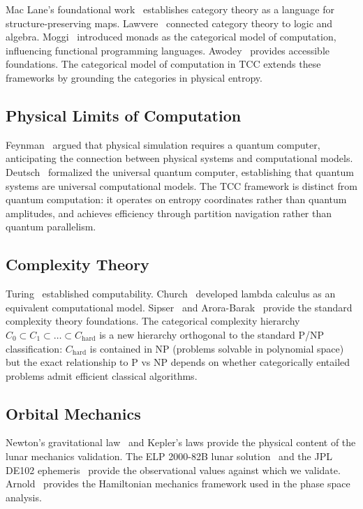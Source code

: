 \documentclass[12pt,twocolumn]{article}
\begin{document}
Mac Lane's foundational work~\cite{maclane1998categories} establishes category theory as a language for structure-preserving maps. Lawvere~\cite{lawvere1963functorial} connected category theory to logic and algebra. Moggi~\cite{moggi1991notions} introduced monads as the categorical model of computation, influencing functional programming languages. Awodey~\cite{awodey2010category} provides accessible foundations. The categorical model of computation in TCC extends these frameworks by grounding the categories in physical entropy.

\subsection{Physical Limits of Computation}

Feynman~\cite{feynman1982simulating} argued that physical simulation requires a quantum computer, anticipating the connection between physical systems and computational models. Deutsch~\cite{deutsch1985quantum} formalized the universal quantum computer, establishing that quantum systems are universal computational models. The TCC framework is distinct from quantum computation: it operates on entropy coordinates rather than quantum amplitudes, and achieves efficiency through partition navigation rather than quantum parallelism.

\subsection{Complexity Theory}

Turing~\cite{turing1936computable} established computability. Church~\cite{church1941calculi} developed lambda calculus as an equivalent computational model. Sipser~\cite{sipser2012introduction} and Arora-Barak~\cite{arora2009computational} provide the standard complexity theory foundations. The categorical complexity hierarchy $C_0 \subset C_1 \subset \ldots \subset C_{\text{hard}}$ is a new hierarchy orthogonal to the standard P/NP classification: $C_{\text{hard}}$ is contained in NP (problems solvable in polynomial space) but the exact relationship to P vs NP depends on whether categorically entailed problems admit efficient classical algorithms.

\subsection{Orbital Mechanics}

Newton's gravitational law~\cite{fitzpatrick2012introduction} and Kepler's laws provide the physical content of the lunar mechanics validation. The ELP 2000-82B lunar solution~\cite{chapront1988lunar} and the JPL DE102 ephemeris~\cite{newhall1983de102} provide the observational values against which we validate. Arnold~\cite{arnold1978mathematical} provides the Hamiltonian mechanics framework used in the phase space analysis.
\end{document}

